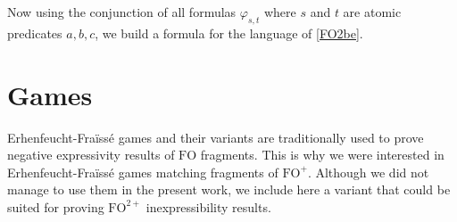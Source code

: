 \documentclass[a4paper,UKenglish,cleveref, autoref, thm-restate]{lipics-v2021}
\newcommand{\FO}{\mathrm{FO}}
\newcommand{\FOp}{\FO^+}
\newcommand{\FOtwp}{\FO^{2+}}
\begin{document}
Now using the conjunction of all formulas $\varphi_{s,t}$ where $s$ and $t$ are atomic predicates $a,b,c$, we build a formula for the language of \cref{FO2be}.

























































    












































\section{Games} \label{ap:games}


Erhenfeucht-Fraïssé games and their variants are traditionally used to prove negative expressivity results of $\FO$ fragments. This is why we were interested in Erhenfeucht-Fraïssé games matching fragments of $\FOp$.
Although we did not manage to use them in the present work, we include here a variant that could be suited for proving $\FOtwp$ inexpressibility results.
\end{document}
